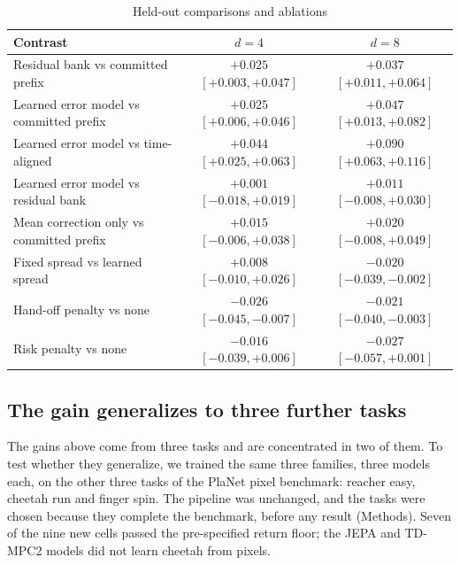 \documentclass[aps,physrev,\manuscriptlayout,superscriptaddress,
  longbibliography,amsmath,amssymb]{revtex4-2}
\begin{document}
\begin{table}[t]
\centering
\caption{Held-out comparisons and ablations}\label{tab:heldout}
\begin{tabular*}{\textwidth}{@{\extracolsep\fill}lcc}
\toprule
Contrast & $d=4$ & $d=8$ \\
\midrule
Residual bank vs committed prefix & $+0.025$ $[+0.003, +0.047]$ & $+0.037$ $[+0.011, +0.064]$ \\
Learned error model vs committed prefix & $+0.025$ $[+0.006, +0.046]$ & $+0.047$ $[+0.013, +0.082]$ \\
Learned error model vs time-aligned & $+0.044$ $[+0.025, +0.063]$ & $+0.090$ $[+0.063, +0.116]$ \\
Learned error model vs residual bank & $+0.001$ $[-0.018, +0.019]$ & $+0.011$ $[-0.008, +0.030]$ \\
Mean correction only vs committed prefix & $+0.015$ $[-0.006, +0.038]$ & $+0.020$ $[-0.008, +0.049]$ \\
Fixed spread vs learned spread & $+0.008$ $[-0.010, +0.026]$ & $-0.020$ $[-0.039, -0.002]$ \\
Hand-off penalty vs none & $-0.026$ $[-0.045, -0.007]$ & $-0.021$ $[-0.040, -0.003]$ \\
Risk penalty vs none & $-0.016$ $[-0.039, +0.006]$ & $-0.027$ $[-0.057, +0.001]$ \\
\bottomrule
\end{tabular*}

\par{}
\end{table}

\subsection{The gain generalizes to three further tasks}\label{sec:newtasks}

The gains above come from three tasks and are concentrated in two of them. To test whether they generalize, we trained the same three families, three models each, on the other three tasks of the PlaNet pixel benchmark\cite{hafner2019planet}: reacher easy, cheetah run and finger spin. The pipeline was unchanged, and the tasks were chosen because they complete the benchmark, before any result (Methods). Seven of the nine new cells passed the pre-specified return floor; the JEPA and TD-MPC2 models did not learn cheetah from pixels.
\end{document}
